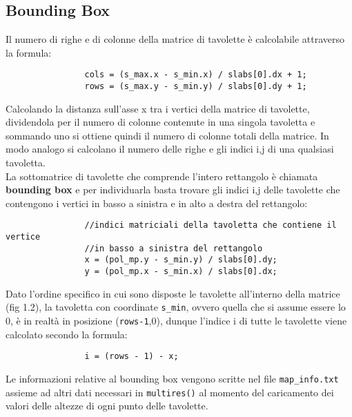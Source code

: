 		\subsection{Bounding Box}
			Il numero di righe e di colonne della matrice di tavolette \`{e} calcolabile attraverso la formula:
			\begin{verbatim}
				cols = (s_max.x - s_min.x) / slabs[0].dx + 1;
				rows = (s_max.y - s_min.y) / slabs[0].dy + 1;
			\end{verbatim} 
			Calcolando la distanza sull'asse x tra i vertici della matrice di tavolette, dividendola per il numero di colonne contenute in una singola tavoletta e sommando uno si ottiene quindi il numero di colonne totali della matrice. In modo analogo si calcolano il numero delle righe e gli indici i,j di una qualsiasi tavoletta.\\
			La sottomatrice di tavolette che comprende l'intero rettangolo \`{e} chiamata \textbf{bounding box} e per individuarla basta trovare gli indici i,j delle tavolette che contengono i vertici in basso a sinistra e in alto a destra del rettangolo:
			\begin{verbatim}
				//indici matriciali della tavoletta che contiene il vertice 
				//in basso a sinistra del rettangolo
				x = (pol_mp.y - s_min.y) / slabs[0].dy;
				y = (pol_mp.x - s_min.x) / slabs[0].dx;
			\end{verbatim} 
			Dato l'ordine specifico in cui sono disposte le tavolette all'interno della matrice (fig 1.2), la tavoletta con coordinate \texttt{s\_min}, ovvero quella che si assume essere lo 0, \`{e} in realt\`{a} in posizione (\texttt{rows-1},0), dunque l'indice i di tutte le tavolette viene calcolato secondo la formula:
			\begin{verbatim}
				i = (rows - 1) - x;
			\end{verbatim} 
			Le informazioni relative al bounding box vengono scritte nel file \texttt{map\_info.txt} assieme ad altri dati necessari in \texttt{multires()} al momento del caricamento dei valori delle altezze di ogni punto delle tavolette.

